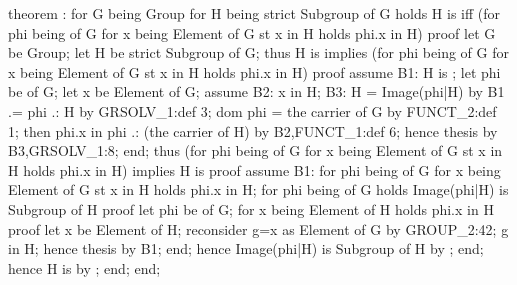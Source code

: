 \nwenddocs{}\endmoddef\nwstartdeflinemarkup{}\nwenddeflinemarkup
theorem :
  for G being Group
  for H being strict Subgroup of G
  holds H is  iff
        (for phi being  of G
         for x being Element of G
         st x in H
         holds phi.x in H)
proof
  let G be Group;
  let H be strict Subgroup of G;
  thus H is  implies (for phi being  of G
                                    for x being Element of G
                                    st x in H
                                    holds phi.x in H)
  proof
    assume B1: H is ;
    let phi be  of G;
    let x be Element of G;
    assume B2: x in H;
    B3: H = Image(phi|H) by B1
         .= phi .: H by GRSOLV_1:def 3;
    dom phi = the carrier of G by FUNCT_2:def 1;
    then phi.x in phi .: (the carrier of H) by B2,FUNCT_1:def 6;
    hence thesis by B3,GRSOLV_1:8;
  end;
  thus (for phi being  of G
        for x being Element of G
        st x in H
        holds phi.x in H)
       implies H is 
  proof
    assume B1: for phi being  of G
               for x being Element of G st x in H holds phi.x in H;
    for phi being  of G holds Image(phi|H) is Subgroup of H
    proof
      let phi be  of G;
      for x being Element of H holds phi.x in H
      proof
        let x be Element of H;
        reconsider g=x as Element of G by GROUP_2:42;
        g in H;
        hence thesis by B1;
      end;
      hence Image(phi|H) is Subgroup of H by ;
    end;
    hence H is  by ;
  end;
end;
\eatline
{}\nwendcode{}\nwdocspar
